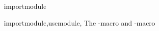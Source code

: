 \documentclass{stex}
\begin{document}
  \begin{smodule}[title=Import Macros]{importmodule}
  
  \begin{sfunction}{importmodule,usemodule}{\importmodule,\usemodule}
    The \dcs-macro and \dcs[usemodule]-macro
  \end{sfunction}
   
  \end{smodule}
\end{document}
